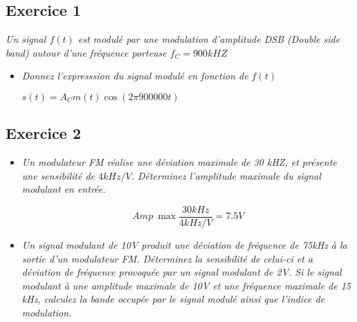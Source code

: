 \subsection{Exercice 1}
\textit{Un signal $f(t)$ est modulé par une modulation d'amplitude DSB (Double side band) autour d'une fréquence porteuse $f_C=900kHZ$}
\begin{itemize}
	\item \textit{Donnez l'expresssion du signal modulé en fonction de $f(t)$}
	\begin{framed}
		$s(t) = A_C m(t) \cos(2\pi 900000t)$
	\end{framed}
\end{itemize}

\subsection{Exercice 2}
\begin{itemize}
	\item \textit{Un modulateur FM réalise une déviation maximale de 30 kHZ, et présente une sensibilité de $4kHz/V$. Déterminez l'amplitude maximale du signal modulant en entrée.}
	\begin{framed}
		\[ Amp\ \max \frac{30kHz}{4kHz/V} = 7.5V \]
	\end{framed}
	\item \textit{Un signal modulant de 10V produit une déviation de fréquence de 75kHz à la sortie d'un modulateur FM\@. Déterminez la sensibilité de celui-ci et a déviation de fréquence provoquée par un signal modulant de 2V. Si le signal modulant à une amplitude maximale de 10V et une fréquence maximale de 15 kHz, calculez la bande occupée par le signal modulé ainsi que l'indice de modulation.}
\end{itemize}

